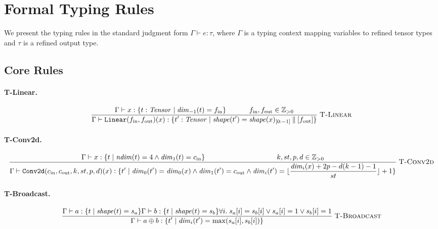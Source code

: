 \documentclass[10pt]{article}
\newcommand{\typerule}[3]{%
  \frac{\displaystyle #2}{\displaystyle #3}
  \;\textsc{#1}%
}
\theoremstyle{plain}
\theoremstyle{definition}
\theoremstyle{remark}
\begin{document}
\section{Formal Typing Rules}\label{sec:typing}

We present the typing rules in the standard judgment form
$\Gamma \vdash e : \tau$, where $\Gamma$ is a typing context
mapping variables to refined tensor types and $\tau$ is a
refined output type.

\subsection{Core Rules}

\paragraph{T-Linear.}
\[
\typerule{T-Linear}{\Gamma \vdash x : \{t : \mathit{Tensor} \mid
      \mathit{dim}_{-1}(t) = f_\text{in}\} \\
   f_\text{in}, f_\text{out} \in \mathbb{Z}_{>0}}{\Gamma \vdash \texttt{Linear}(f_\text{in}, f_\text{out})(x) :
    \{t' : \mathit{Tensor} \mid
      \mathit{shape}(t') = \mathit{shape}(x)_{[0:-1]}
      \mathbin\| [f_\text{out}]\}}
\]

\paragraph{T-Conv2d.}
\[
\typerule{T-Conv2d}{\Gamma \vdash x : \{t \mid
      \mathit{ndim}(t) = 4 \land \mathit{dim}_1(t) = c_\text{in}\} \\
   k, st, p, d \in \mathbb{Z}_{>0}}{\Gamma \vdash \texttt{Conv2d}(c_\text{in}, c_\text{out}, k,
    st, p, d)(x) :
    \{t' \mid \mathit{dim}_0(t') = \mathit{dim}_0(x) \land
      \mathit{dim}_1(t') = c_\text{out} \land
      \mathit{dim}_i(t') = \lfloor\frac{\mathit{dim}_i(x) + 2p -
        d(k-1) - 1}{st}\rfloor + 1\}}
\]

\paragraph{T-Broadcast.}
\[
\typerule{T-Broadcast}{\Gamma \vdash a : \{t \mid \mathit{shape}(t) = s_a\} \\
   \Gamma \vdash b : \{t \mid \mathit{shape}(t) = s_b\} \\
   \forall i.\; s_a[i] = s_b[i] \lor s_a[i] = 1 \lor s_b[i] = 1}{\Gamma \vdash a \oplus b :
    \{t' \mid \mathit{dim}_i(t') = \max(s_a[i], s_b[i])\}}
\]
\end{document}
